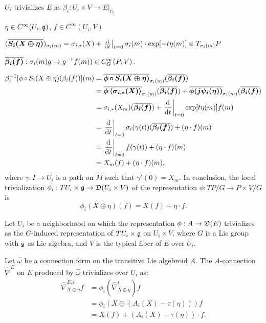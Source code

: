 \begin{example}[Local trivialization of representation of $TP/G$ on $E = P \times V/G$]\label{localTrivializationOfRepresentationOfAtiyahTPGonAssociated}
$U_i$ trivializes $E$ as $\beta_i: U_i \times V\to E|_{U_i}$

$\eta \in C^\infty(U_i, \mathfrak{g})$, $f \in C^\infty(U_i, V)$

$(\upsect{S_i(X \oplus \eta)})_{\sigma_i(m)} = \sigma_{i, *}(X) + \der{t}[t=0]{\sigma_i(m) \cdot \exp[-t \eta(m)]} \in T_{\sigma_i(m)} P$


$\overline{\bm{\beta_i(f)}}: \sigma_i(m)g \mapsto g^{-1} f(m)) \in C^\infty_G(P, V)$.


\begin{align*}
    \beta_i^{-1}[\phi\comp S_i(X \oplus \eta)(\beta_i(f))] (m)
        &= \upsect{\phi \comp S_i(X \oplus \eta)}_{\sigma_i(m)} (\upsect{\beta_i(f)})\\
        &= \upsect{\phi\cl{\sigma_{i, *}(X)}}_{\sigma_i(m)} (\upsect{\beta_i(f)}) + \upsect{\phi( j\psi_i(\eta))}_{\sigma_i(m)} (\upsect{\beta_i(f)})\\
        &= \sigma_{i, *}(X_m)(\upsect{\beta_i(f)}) + \der{t}[t=0]{\exp[t \eta(m)] f(m)}\\
        &= \der{t}[t = 0]{\sigma_i(\gamma(t))} (\upsect{\beta_i(f)}) + (\eta \cdot f)(m)\\
        &= \der{t}[t=0]{f(\gamma(t))} + (\eta \cdot f)(m)\\
        &= X_m(f) + (\eta \cdot f)(m),
\end{align*}
where $\gamma: I \to U_i$ is a path on $M$ such that $\gamma'(0) = X_m$. In conclusion, the local trivialization $\phi_i: TU_i \times \alg g \to \alg D(U_i \times V)$ of the representation $\phi: TP/G \to P \times V/G$ is
\begin{equation}\label{equationLocalRepresentationAtiyahLieAlgebroidOnAssociatedVectorBundleExpectedTrivialALgebroidRepresentationActionOfGroup}
    \phi_i(X \oplus \eta)(f) = X(f) + \eta \cdot f.
\end{equation}
\end{example}

\begin{example}
Let $U_i$ be a neighborhood on which the representation $\phi:A \to \alg D(E)$ trivializes as the $G$-induced representation of $TU_i\times \mathfrak{g}$ on $U_i \times V$, where $G$ is a Lie group with $\mathfrak{g}$ as Lie algebra, and $V$ is the typical fiber of $E$ over $U_i$.

Let $\hat \omega$ be a connection form on the transitive Lie algebroid $A$. The $A$-connection $\hat \nabla^E$ on $E$ produced by $\hat \omega$ trivializes  over $U_i$ as:
\begin{align*}
    \hat \nabla^{E, i}_{X \oplus \eta} f
        &= \phi_i(\hat \nabla^i_{X \oplus \eta}) f\\
        &= \phi_i( X \oplus (A_i(X) - \tau(\eta))) f\\
        &= X(f) + (A_i(X) - \tau(\eta))\cdot f.
\end{align*}
\end{example}



